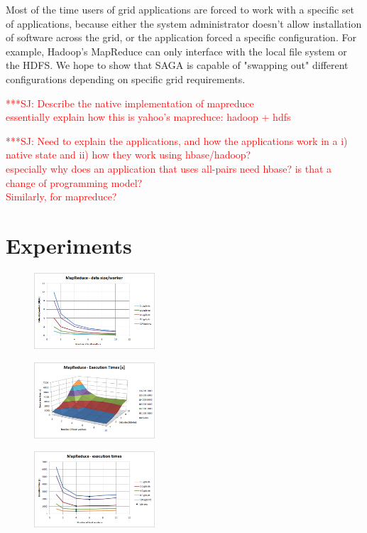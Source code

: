 \documentclass[conference,final]{IEEEtran}
\newcommand{\jhanote}[1]{ {\textcolor{red} { ***SJ: #1 }}}
\newcommand{\jhanote}[1]{}
\begin{document}
Most of the time users of grid applications are forced to work with a
specific set of applications, because either the system administrator
doesn't allow installation of software across the grid, or the
application forced a specific configuration.  For example, Hadoop's
MapReduce can only interface with the local file system or the HDFS.
We hope to show that SAGA is capable of "swapping out" different
configurations depending on specific grid requirements.

\jhanote{Describe the native implementation of mapreduce\\
  essentially explain how this is yahoo's mapreduce: hadoop + hdfs}

\jhanote{Need to explain the applications, and how the applications
  work in a i) native state and ii) how they work using hbase/hadoop? \\
  especially why does an application that uses all-pairs need hbase?
  is that a change of programming model?  \\ Similarly, for
  mapreduce?}


\section*{Experiments}

\begin{figure}[t]
  \includegraphics[width=0.4\textwidth]{MapReduce_local_datasizeperworker.png}
\label{}
\end{figure}

\begin{figure}[t]
  \includegraphics[width=0.4\textwidth]{MapReduce_local_executiontime_3d.png}
\label{}
\end{figure}

\begin{figure}[t]
  \includegraphics[width=0.4\textwidth]{MapReduce_local_executiontime.png}
\label{}
\end{figure}
\end{document}
